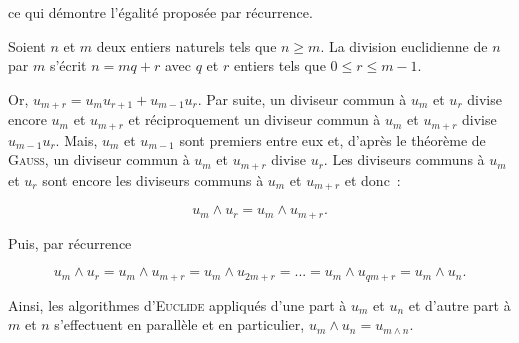 {\begin{enumerate}
{ce qui démontre l'égalité proposée par récurrence.

Soient $n$ et $m$ deux entiers naturels tels que $n\geq m$. La division euclidienne de $n$ par $m$ s'écrit $n=mq+r$ avec $q$ et $r$ entiers tels que $0\leq r\leq m-1$.

Or, $u_{m+r}=u_mu_{r+1}+u_{m-1}u_r$. Par suite, un diviseur commun à $u_m$ et $u_r$ divise encore $u_m$ et $u_{m+r}$ et réciproquement un diviseur commun à $u_m$ et $u_{m+r}$ divise $u_{m-1}u_r$. Mais, $u_m$ et $u_{m-1}$ sont premiers entre eux et, d'après le théorème de \textsc{Gauss}, un diviseur commun à $u_m$ et $u_{m+r}$ divise $u_r$. Les diviseurs communs à $u_m$ et $u_r$ sont encore les diviseurs communs à $u_m$ et $u_{m+r}$ et donc~:

$$u_m\wedge u_r=u_m\wedge u_{m+r}.$$
 
Puis, par récurrence 

$$u_m\wedge u_r=u_m\wedge u_{m+r}=u_m\wedge u_{2m+r}=...=u_m\wedge u_{qm+r}=u_m\wedge u_n.$$

Ainsi, les algorithmes d'\textsc{Euclide} appliqués d'une part à $u_m$ et $u_n$ et d'autre part à $m$ et $n$ s'effectuent en parallèle et en particulier, $u_m\wedge u_n=u_{m\wedge n}.$}
\end{enumerate}
}